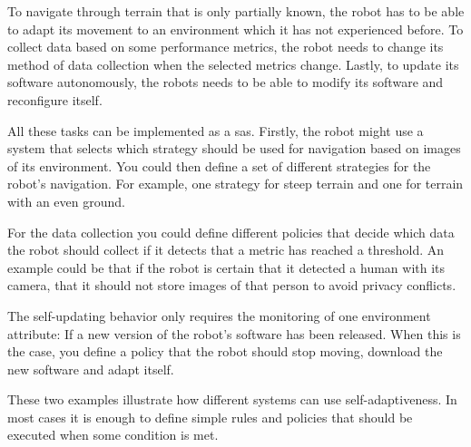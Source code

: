\noindent To navigate through terrain that is only partially known, the robot has to be able to adapt
its movement to an environment which it has not experienced before. 
To collect data based on some performance metrics, the robot needs to change its method
of data collection when the selected metrics change.
Lastly, to update its software autonomously, the robots needs to be able
to modify its software and reconfigure itself.

\noindent All these tasks can be implemented as a \acrshort{sas}.
Firstly, the robot might use a system that selects
which strategy should be used for navigation based on images of its environment.
You could then define a set of different strategies for the robot's navigation.
For example, one strategy for steep terrain and one for terrain with an even ground.

\noindent For the data collection you could define different policies
that decide which data the robot should collect if it detects that a metric has reached a threshold.
An example could be that if the robot is certain that it detected a human with its camera,
that it should not store images of that person to avoid privacy conflicts.

\noindent The self-updating behavior only requires the monitoring of one environment attribute:
If a new version of the robot's software has been released.
When this is the case, you define a policy that the robot should stop moving, download the new software
and adapt itself.

\noindent These two examples illustrate how different systems can use self-adaptiveness.
In most cases it is enough to define simple rules and policies that should be executed
when some condition is met.